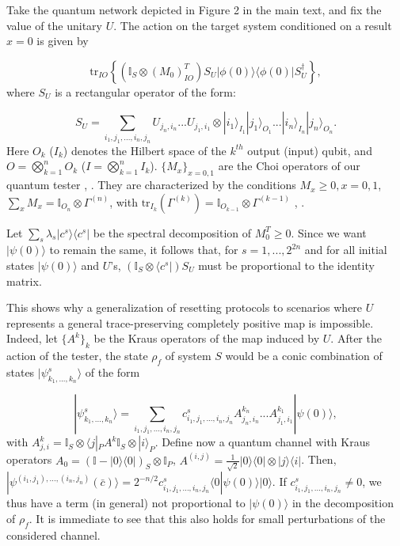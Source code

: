 \documentclass[twocolumn,prx,aps,longbibliography]{revtex4-1}
\def\be{\begin{equation}}
\def\ee{\end{equation}}
\def\id{{\mathbb I}}
\def\tr{\mbox{tr}}
\def\bra#1{\langle#1|} \def\ket#1{|#1\rangle}
\def\braket#1#2{\langle#1|#2\rangle}
\def\proj#1{\ket{#1}\!\bra{#1}}
\def\id{{\mathbb I}}
\begin{document}
\begin{appendix}
Take the quantum network depicted in Figure 2 in the main text, and fix the value of the unitary $U$. The action on the target system conditioned on a result $x=0$ is given by

\be
\tr_{IO}\left\{(\id_S\otimes (M_0)^T_{IO}) S_U\ket{\phi(0)}\bra{\phi(0)}S_U^\dagger\right\},
\ee
\noindent where $S_U$ is a rectangular operator of the form:

\be
S_U=\sum_{i_1,j_1,...,i_n,j_n}U_{j_n,i_n}...U_{j_1,i_1}\otimes\ket{i_1}_{I_1}\ket{j_1}_{O_1}...\ket{i_n}_{I_n}\ket{j_n}_{O_n}.
\ee
Here $O_k$ ($I_k$) denotes the Hilbert space of the $k^{th}$ output (input) qubit, and $O=\bigotimes_{k=1}^n O_k$ ($I=\bigotimes_{k=1}^n I_k$). $\{M_x\}_{x=0,1}$ are the Choi operators of our quantum tester \cite{tester}, \cite{tester2}. They are characterized by the conditions $M_x\geq 0, x=0,1$, $\sum_x M_x=\id_{O_n}\otimes \Gamma^{(n)}$, with $\tr_{I_{k}}(\Gamma^{(k)})=\id_{O_{k-1}}\otimes \Gamma^{(k-1)}$ \cite{tester}, \cite{tester2}.

Let $\sum_s\lambda_s\ket{c^s}\bra{c^s}$ be the spectral decomposition of $M^T_0\geq 0$. Since we want $\ket{\psi(0)}$ to remain the same, it follows that, for $s=1,...,2^{2n}$ and for all initial states $\ket{\psi(0)}$ and $U$'s, $(\id_S\otimes \bra{c^s})S_U$ must be proportional to the identity matrix. 

This shows why a generalization of resetting protocols to scenarios where $U$ represents a general trace-preserving completely positive map is impossible. Indeed, let $\{A^k\}_k$ be the Kraus operators of the map induced by $U$. After the action of the tester, the state $\rho_f$ of system $S$ would be a conic combination of states $\ket{\psi_{k_1,...,k_n}^s}$ of the form

\be
\ket{\psi_{k_1,...,k_n}^s}=\sum_{i_1,j_1,...,i_n,j_n}c^s_{i_1,j_1,...,i_n,j_n}A^{k_n}_{j_n,i_n}...A^{k_1}_{j_1,i_1}\ket{\psi(0)},
\ee
\noindent with $A^{k}_{j,i}=\id_S\otimes\bra{j}_P A^k\id_S\otimes\ket{i}_P$. Define now a quantum channel with Kraus operators $A_0=(\id-\proj{0})_S\otimes \id_P$, $A^{(i,j)}=\frac{1}{\sqrt{2}}\proj{0}\otimes\ket{j}\bra{i}$. Then, $\ket{\psi^{(i_1,j_1),...,(i_n,j_n)}(\bar{c})}=2^{-n/2}c^s_{i_1,j_1,...,i_n,j_n}\braket{0}{\psi(0)}\ket{0}$. If $c^s_{i_1,j_1,...,i_n,j_n}\not=0$, we thus have a term (in general) not proportional to $\ket{\psi(0)}$ in the decomposition of $\rho_f$. It is immediate to see that this also holds for small perturbations of the considered channel.



\end{appendix}
\end{document}
